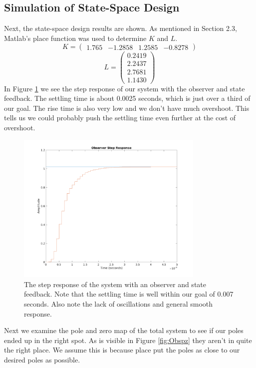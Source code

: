 \documentclass[11pt]{article}
\begin{document}
\subsection{Simulation of State-Space Design}
Next, the state-space design results are shown. As mentioned in Section 2.3, Matlab's place function was used to determine $K$ and $L$.
\[ K = \left( \begin{array}{cccc}
1.765 & -1.2858 & 1.2585 & -0.8278
 \end{array} \right)\] 
 \[ L = \left( \begin{array}{c}
0.2419  \\
2.2437 \\
2.7681 \\
1.1430 \end{array} \right)\] 
In Figure \ref{fig:StepObs} we see the step response of our system with the observer and state feedback. The settling time is about 0.0025 seconds, which is just over a third of our goal. The rise time is also very low and we don't have much overshoot. This tells us we could probably push the settling time even further at the cost of overshoot.
\begin{figure}[H]
    \centering
    \includegraphics[width=0.8\textwidth]{OBSERVER_STEP.png}
    \caption{The step response of the system with an observer and state feedback. Note that the settling time is well within our goal of 0.007 seconds. Also note the lack of oscillations and general smooth response.}
    \label{fig:StepObs}
\end{figure}
Next we examine the pole and zero map of the total system to see if our poles ended up in the right spot. As is visible in Figure \ref{fig:Obspz} they aren't in quite the right place. We assume this is because place put the poles as close to our desired poles as possible. 
\end{document}
